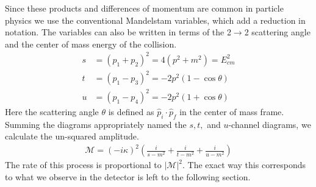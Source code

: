 Since these products and differences of momentum are common in particle physics we use
the conventional Mandelstam variables, which add a reduction in notation. The variables can also be written in terms
of the 2$\rightarrow$2 scattering angle and the center of mass energy of the collision. 
\begin{align*}
s&=(p_1+p_2)^2 = 4(p^2+m^2) = E_{cm}^2 \\
t&=(p_1-p_3)^2 = -2p^2(1-\cos\theta)\\
u&=(p_1-p_4)^2 = -2p^2(1+\cos\theta) 
\end{align*}
Here the scattering angle $\theta$ is defined as $\hat p_i \cdot \hat p_f$ in the center 
of mass frame. Summing the diagrams appropriately named the $s,t,$ 
and $u$-channel diagrams, we calculate the un-squared amplitude. 
\begin{align*}
\mathcal{M} = (-i\kappa)^2\left( \frac{i}{s-m^2} + \frac{i}{t-m^2} + \frac{i}{u-m^2} \right)
\end{align*}
The rate of this process is proportional to $|\mathcal{M}|^2$. The exact way this corresponds to what we observe in 
the detector is left to the following section.

